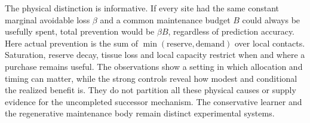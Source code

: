 The physical distinction is informative. If every site had the same constant marginal avoidable loss $\beta$ and a common maintenance budget $B$ could always be usefully spent, total prevention would be $\beta B$, regardless of prediction accuracy. Here actual prevention is the sum of $\min(\text{reserve},\text{demand})$ over local contacts. Saturation, reserve decay, tissue loss and local capacity restrict when and where a purchase remains useful. The observations show a setting in which allocation and timing can matter, while the strong controls reveal how modest and conditional the realized benefit is. They do not partition all these physical causes or supply evidence for the uncompleted successor mechanism. The conservative learner and the regenerative maintenance body remain distinct experimental systems.



